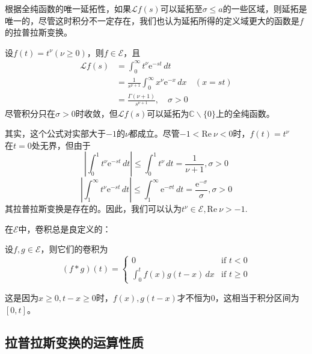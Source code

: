 根据全纯函数的唯一延拓性，如果$\mathcal{L} f(s)$可以延拓至$\sigma\leq a$的一些区域，则延拓是唯一的，尽管这时积分不一定存在，我们也认为延拓所得的定义域更大的函数是$f$的拉普拉斯变换。
\begin{example}[多项式的拉普拉斯变换]
    设$f(t)=t^\nu(\nu\geq 0)$，则$f\in\mathcal{E} $，且
    \begin{align*}
        \mathcal{L} f(s)&=\int_0^{\infty}t^\nu \mathrm{e}^{-st}\,dt\\
        &=\frac{1}{s^{\nu+1}}\int_0^{\infty}x^\nu \mathrm{e}^{-x}\,dx&(x=st)\\
        &=\frac{\Gamma(\nu+1)}{s^{\nu+1}},\quad \sigma>0
    \end{align*}
尽管积分只在$\sigma>0$时收敛，但$\mathcal{L} f(s)$可以延拓为$\mathbb{C}\backslash\{0\}$上的全纯函数。
\begin{remark}
    其实，这个公式对实部大于$-1$的$\nu$都成立。尽管$-1<\text{Re}\ \nu<0$时，$f(t)=t^\nu$\\
    在$t=0$处无界，但由于
\[\left|\int_{0}^{1}t^{\nu}\mathrm{e}^{-st}\,dt\right|\leq \int_0^1 t^\nu\,dt=\frac{1}{\nu+1},\sigma>0\]
\[\left|\int_{1}^{\infty}t^{\nu}\mathrm{e}^{-st}\,dt\right|\leq \int_1^\infty \mathrm{e}^{-\sigma t}\,dt=\frac{\mathrm{e}^{-\sigma}}{\sigma},\sigma>0\]
其拉普拉斯变换是存在的。因此，我们可以认为$t^\nu\in\mathcal{E},\text{Re}\ \nu>-1$.
\end{remark}
\end{example}

在$\mathcal{E} $中，卷积总是良定义的：
\begin{proposition}
    设$f,g\in\mathcal{E} $，则它们的卷积为
    \[(f*g)(t)=\begin{cases}
    0                   & \text{if } t<0 \\
    \int_0^t f(x)g(t-x)\,dx & \text{if } t\geq 0
    \end{cases}\]
\end{proposition}
这是因为$x\geq 0,t-x\geq 0$时，$f(x),g(t-x)$才不恒为0，这相当于积分区间为$[0,t]$。

\subsection{拉普拉斯变换的运算性质}\label{sub:laplace_operation}

